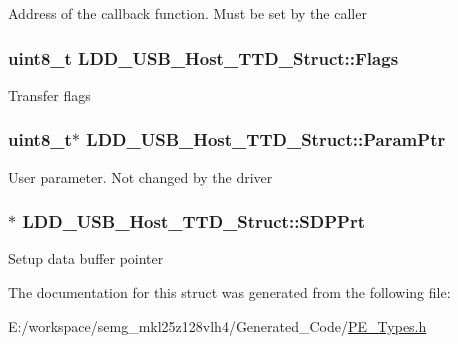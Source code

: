 Address of the callback function. Must be set by the caller \hypertarget{struct_l_d_d___u_s_b___host___t_t_d___struct_a083f54cb9e59a2206aca7d5481154c27}{
\subsubsection[{Flags}]{\setlength{\rightskip}{0pt plus 5cm}uint8\-\_\-t L\-D\-D\-\_\-\-U\-S\-B\-\_\-\-Host\-\_\-\-T\-T\-D\-\_\-\-Struct\-::\-Flags}}\label{struct_l_d_d___u_s_b___host___t_t_d___struct_a083f54cb9e59a2206aca7d5481154c27}
Transfer flags \hypertarget{struct_l_d_d___u_s_b___host___t_t_d___struct_ab6fd6fdfe1e3e43cbdb5e1f2f61b3265}{
\subsubsection[{Param\-Ptr}]{\setlength{\rightskip}{0pt plus 5cm}uint8\-\_\-t$\ast$ L\-D\-D\-\_\-\-U\-S\-B\-\_\-\-Host\-\_\-\-T\-T\-D\-\_\-\-Struct\-::\-Param\-Ptr}}\label{struct_l_d_d___u_s_b___host___t_t_d___struct_ab6fd6fdfe1e3e43cbdb5e1f2f61b3265}
User parameter. Not changed by the driver \hypertarget{struct_l_d_d___u_s_b___host___t_t_d___struct_af1881ea197419558fdb55dc5f98ee446}{
\subsubsection[{S\-D\-P\-Prt}]{$\ast$ L\-D\-D\-\_\-\-U\-S\-B\-\_\-\-Host\-\_\-\-T\-T\-D\-\_\-\-Struct\-::\-S\-D\-P\-Prt}}\label{struct_l_d_d___u_s_b___host___t_t_d___struct_af1881ea197419558fdb55dc5f98ee446}
Setup data buffer pointer 

The documentation for this struct was generated from the following file\-:\begin{DoxyCompactItemize}
\item 
E\-:/workspace/semg\-\_\-mkl25z128vlh4/\-Generated\-\_\-\-Code/\hyperlink{_p_e___types_8h}{P\-E\-\_\-\-Types.\-h}\end{DoxyCompactItemize}
